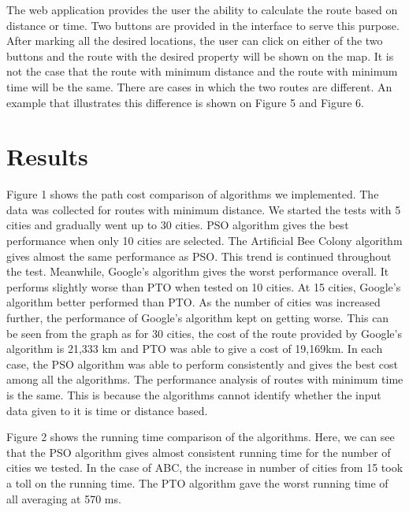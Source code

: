 \documentclass[conference]{IEEEtran}
\begin{document}
The web application provides the user the ability to calculate the route based on distance or time. Two buttons are provided in the interface to serve this purpose. After marking all the desired locations, the user can click on either of the two buttons and the route with the desired property will be shown on the map. It is not the case that the route with minimum distance and the route with minimum time will be the same. There are cases in which the two routes are different. An example that illustrates this difference is shown on Figure 5 and Figure 6.

\section {Results}

Figure 1 shows the path cost comparison of algorithms we implemented. The data was collected for routes with minimum distance. We started the tests with 5 cities and gradually went up to 30 cities. PSO algorithm gives the best performance when only 10 cities are selected. The Artificial Bee Colony algorithm gives almost the same performance as PSO.  This trend is continued throughout the test. Meanwhile, Google’s algorithm gives the worst performance overall. It performs slightly worse than PTO when tested on 10 cities. At 15 cities, Google’s algorithm better performed than PTO. As the number of cities was increased further, the performance of Google’s algorithm kept on getting worse. This can be seen from the graph as for 30 cities, the cost of the route provided by Google’s algorithm is 21,333 km and PTO was able to give a cost of 19,169km. In each case, the PSO algorithm was able to perform consistently and gives the best cost among all the algorithms. The performance analysis of routes with minimum time is the same. This is because the algorithms cannot identify whether the input data given to it is time or distance based.

Figure 2 shows the running time comparison of the algorithms. Here, we can see that the PSO algorithm gives almost consistent running time for the number of cities we tested. In the case of ABC, the increase in number of cities from 15 took a toll on the running time. The PTO algorithm gave the worst running time of all averaging at 570 ms. 
\end{document}
